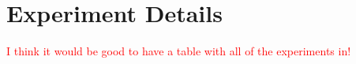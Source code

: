 \documentclass[draft]{agujournal2019}
\newcommand{\red}[1]{\textcolor{red}{#1}}
\begin{document}





\section{Experiment Details}\label{S:Experiment}
\red{I think it would be good to have a table with all of the experiments in!}
\end{document}
